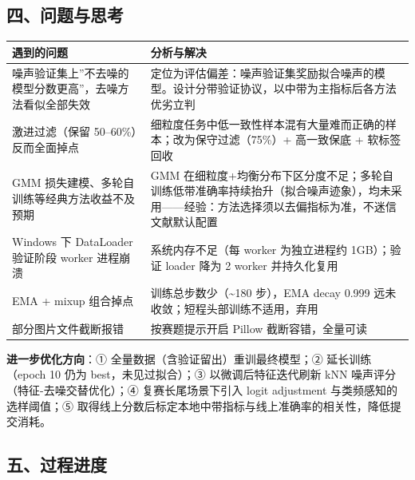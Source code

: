 \documentclass[
]{article}
\begin{document}
\subsection{四、问题与思考}\label{ux56dbux95eeux9898ux4e0eux601dux8003}

\begin{longtable}[]{@{}
  >{\raggedright\arraybackslash}p{}
  >{\raggedright\arraybackslash}p{}@{}}
\toprule\noalign{}
\begin{minipage}[b]{\linewidth}\raggedright
遇到的问题
\end{minipage} & \begin{minipage}[b]{\linewidth}\raggedright
分析与解决
\end{minipage} \\
\midrule\noalign{}
\endhead
\bottomrule\noalign{}
\endlastfoot
噪声验证集上''不去噪的模型分数更高''，去噪方法看似全部失效 &
定位为评估偏差：噪声验证集奖励拟合噪声的模型。设计分带验证协议，以中带为主指标后各方法优劣立判 \\
激进过滤（保留 50--60\%）反而全面掉点 &
细粒度任务中低一致性样本混有大量难而正确的样本；改为保守过滤（75\%）+
高一致保底 + 软标签回收 \\
GMM 损失建模、多轮自训练等经典方法收益不及预期 & GMM
在细粒度+均衡分布下区分度不足；多轮自训练低带准确率持续抬升（拟合噪声迹象），均未采用------经验：方法选择须以去偏指标为准，不迷信文献默认配置 \\
Windows 下 DataLoader 验证阶段 worker 进程崩溃 & 系统内存不足（每 worker
为独立进程约 1GB）；验证 loader 降为 2 worker 并持久化复用 \\
EMA + mixup 组合掉点 & 训练总步数少（\textasciitilde180 步），EMA decay
0.999 远未收敛；短程头部训练不适用，弃用 \\
部分图片文件截断报错 & 按赛题提示开启 Pillow 截断容错，全量可读 \\
\end{longtable}

\textbf{进一步优化方向}：① 全量数据（含验证留出）重训最终模型；②
延长训练（epoch 10 仍为 best，未见过拟合）；③ 以微调后特征迭代刷新 kNN
噪声评分（特征-去噪交替优化）；④ 复赛长尾场景下引入 logit adjustment
与类频感知的选样阈值；⑤
取得线上分数后标定本地中带指标与线上准确率的相关性，降低提交消耗。

\subsection{五、过程进度}\label{ux4e94ux8fc7ux7a0bux8fdbux5ea6}
\end{document}
